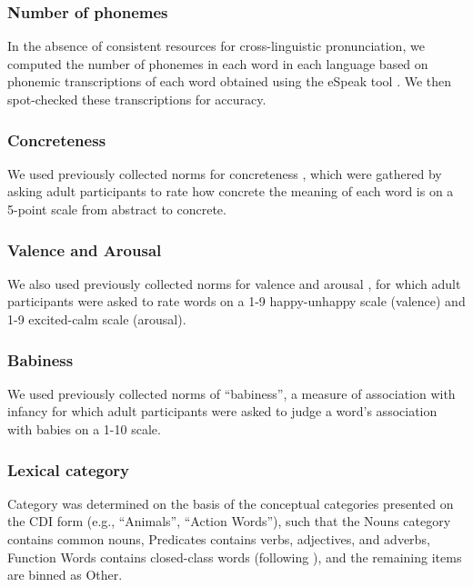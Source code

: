 \documentclass[manuscript]{stjour}
\begin{document}
\subsubsection{Number of phonemes}

In the absence of consistent resources for cross-linguistic
pronunciation, we computed the number of phonemes in each word in each
language based on phonemic transcriptions of each word obtained using
the eSpeak tool \citep{duddington2012}. We then spot-checked these
transcriptions for accuracy.

\subsubsection{Concreteness}

We used previously collected norms for concreteness
\citep{brysbaert2014}, which were gathered by asking adult participants
to rate how concrete the meaning of each word is on a 5-point scale from
abstract to concrete.

\subsubsection{Valence and Arousal}

We also used previously collected norms for valence and arousal
\citep{warriner2013}, for which adult participants were asked to rate
words on a 1-9 happy-unhappy scale (valence) and 1-9 excited-calm scale
(arousal).

\subsubsection{Babiness}

We used previously collected norms of ``babiness'', a measure of
association with infancy \citep{perry2015} for which adult participants
were asked to judge a word's association with babies on a 1-10 scale.

\subsubsection{Lexical category}

Category was determined on the basis of the conceptual categories
presented on the CDI form (e.g., ``Animals'', ``Action Words''), such
that the Nouns category contains common nouns, Predicates contains
verbs, adjectives, and adverbs, Function Words contains closed-class
words (following \citealp{bates1994}), and the remaining items are
binned as Other.
\end{document}
